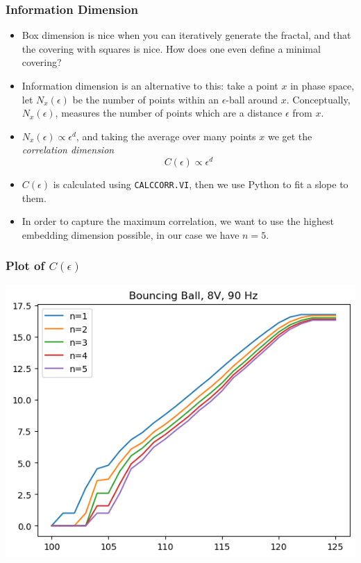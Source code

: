 \documentclass[9pt]{beamer}
\begin{document}
\begin{frame}
	\frametitle{Information Dimension}
	\begin{itemize}
		\item Box dimension is nice when you can iteratively generate the fractal,
			and that the covering with squares is nice. How does one even define a
			minimal covering?       
		\item Information dimension is an alternative to this: take a point \( x \)
			in phase space, let \( N_x(\epsilon) \) be the number of points within an
			\( \epsilon \)-ball around \( x \). Conceptually, \( N_x(\epsilon) \),
			measures the number of points which are a distance \( \epsilon \) from
			\( x \).
		\item \( N_x(\epsilon) \propto \epsilon^{d}\), and taking the average over
			many points \( x \) we get the \textit{correlation dimension}
			\[
				C(\epsilon) \propto \epsilon^{d}
			\]
		\item \( C(\epsilon) \) is calculated using \texttt{CALCCORR.VI}, then we use
			Python to fit a slope to them. 
		\item In order to capture the maximum correlation, we want to use the highest
			embedding dimension possible, in our case we have \( n = 5 \). 
	\end{itemize}
\end{frame}

\begin{frame}
	\frametitle{Plot of \( C(\epsilon) \)}
	\begin{center}
		\includegraphics[scale=0.5]{images/corr_example.png}
	\end{center}
\end{frame}
\end{document}
